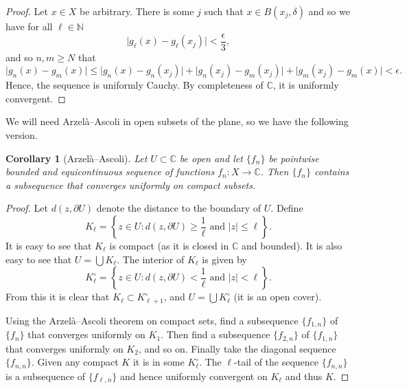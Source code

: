 \documentclass[12pt,openany]{book}
\newcommand{\sabs}[1]{\lvert {#1} \rvert}
\newcommand{\C}{{\mathbb{C}}}
\newcommand{\N}{{\mathbb{N}}}
\theoremstyle{plain}
\newtheorem{cor}[thm]{Corollary}
\theoremstyle{remark}
\theoremstyle{definition}
\theoremstyle{exercise}
\theoremstyle{example}
\begin{document}
\begin{proof}
Let $x \in X$ be arbitrary.  There is some $j$ such that
$x \in B(x_j,\delta)$ and so we have for all $\ell \in \N$
\begin{equation*}
\sabs{g_\ell(x)-g_\ell(x_j)} < \frac{\epsilon}{3},
\end{equation*}
and so $n,m \geq N$ that
\begin{equation*}
\sabs{g_n(x)-g_m(x)} \leq
\sabs{g_n(x)-g_n(x_j)} +
\sabs{g_n(x_j)-g_m(x_j)} +
\sabs{g_m(x_j)-g_m(x)} <
\epsilon .
\end{equation*}
Hence, the sequence is uniformly Cauchy.  By completeness of $\C$,
it is uniformly convergent.
\end{proof}

We will need Arzel\`a--Ascoli in open subsets of the plane, so we have the
following version.

\begin{cor}[Arzel\`a--Ascoli]
\label{cor:arzelaascoliplane}
Let $U \subset \C$ be open and let $\{ f_n \}$
be pointwise bounded and equicontinuous sequence
of functions $f_n \colon X \to \C$.  Then
$\{ f_n \}$ contains a subsequence
that converges uniformly on compact subsets.
\end{cor}

\begin{proof}
Let $d(z,\partial U)$ denote the distance to the boundary of $U$.  Define
\begin{equation*}
K_\ell = \left\{
z \in U : d(z,\partial U) \geq \frac{1}{\ell} \text{ and } \sabs{z} \leq
\ell
\right\} .
\end{equation*}
It is easy to see that $K_\ell$ is compact (as it is closed in $\C$ and bounded).
It is also easy to see that $U = \bigcup K_\ell$.  The interior of
$K_\ell$ is given by
\begin{equation*}
K^\circ_\ell = \left\{
z \in U : d(z,\partial U) < \frac{1}{\ell} \text{ and } \sabs{z} < \ell
\right\} .
\end{equation*}
From this it is clear that $K_\ell \subset K^\circ_{\ell+1}$, and
$U = \bigcup K^\circ_\ell$ (it is an open cover).

Using the Arzel\`a--Ascoli theorem on compact sets,
find a subsequence $\{ f_{1,n} \}$  of $\{f_n\}$ that converges uniformly
on $K_1$.  Then find a subsequence
$\{ f_{2,n} \}$ of
$\{ f_{1,n} \}$ that converges uniformly on $K_2$, and so on.
Finally take the diagonal sequence $\{ f_{n,n} \}$.  Given any compact $K$
it is in some $K^\circ_\ell$.  The $\ell$-tail of the sequence $\{ f_{n,n}
\}$ is a subsequence of $\{ f_{\ell,n} \}$ and hence uniformly convergent on
$K_\ell$ and thus $K$.
\end{proof}
\end{document}
